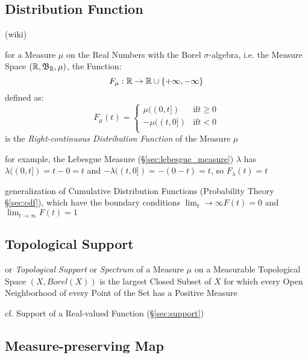 \subsection{Distribution Function}\label{sec:distribution_function}

(wiki)

for a Measure $\mu$ on the Real Numbers with the Borel $\sigma$-algebra, i.e.
the Measure Space $(\mathbb{R}, \mathfrak{B}_{\mathbb{R}}, \mu)$, the Function:
\[
  F_\mu : \mathbb{R} \rightarrow \mathbb{R} \cup \{+\infty, -\infty\}
\]
defined as:
\[
  F_\mu(t) = \begin{cases}
     \mu((0,t]) & \text{if} t \geq 0 \\
    -\mu((t,0]) & \text{if} t < 0 \\
  \end{cases}
\]
is the \emph{Right-continuous Distribution Function} of the Measure $\mu$

for example, the Lebesgue Measure (\S\ref{sec:lebesgue_measure}) $\lambda$ has
$\lambda((0,t]) = t - 0 = t$ and $-\lambda((t,0]) = -(0 - t) = t$, so
$F_\lambda(t) = t$

generalization of Cumulative Distribution Functions (Probability Theory
\S\ref{sec:cdf}), which have the boundary conditions
$\lim_t\rightarrow\infty F(t) = 0$ and $\lim_{t\rightarrow\infty}F(t) = 1$



\subsection{Topological Support}\label{sec:topological_support}

or \emph{Topological Support} or \emph{Spectrum} of a Measure $\mu$ on a
Measurable Topological Space $(\xspace{X}, Borel(\xspace{X}))$ is the largest
Closed Subset of $\xspace{X}$ for which every Open Neighborhood of every Point
of the Set has a Positive Measure

cf. Support of a Real-valued Function (\S\ref{sec:support})



\subsection{Measure-preserving Map}\label{sec:measure_preserving_map}

